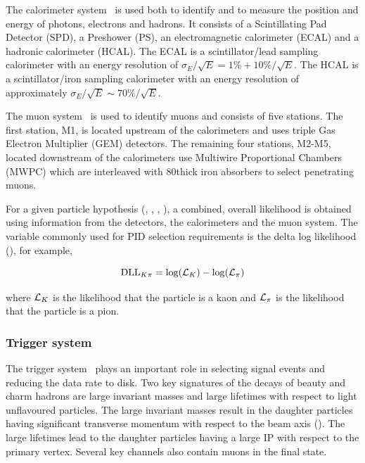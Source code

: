 The calorimeter system~\cite{LHCb-TDR-002} is used both to identify and to measure the position and energy of photons, electrons and hadrons. It consists of a Scintillating Pad Detector (SPD), a Preshower (PS), an electromagnetic calorimeter (ECAL) and a hadronic calorimeter (HCAL). The ECAL is a scintillator/lead sampling calorimeter with an energy resolution of $\sigma_{E}/\sqrt{E} = 1\% + 10\%/\sqrt{E}$. The HCAL is a scintillator/iron sampling calorimeter with an energy resolution of approximately $\sigma_{E}/\sqrt{E} \sim 70\%/\sqrt{E}$. 

The muon system~\cite{LHCb-TDR-004,muon-tdr2,muon-tdr3,LHCb-DP-2012-002} is used to identify muons and consists of five stations. The first station, M1, is located upstream of the calorimeters and uses triple Gas Electron Multiplier (GEM) detectors. The remaining four stations, M2-M5, located downstream of the calorimeters use Multiwire Proportional Chambers (MWPC) which are interleaved with 80\cm thick iron absorbers to select penetrating muons.

For a given particle hypothesis (\kaon, \pion, \muon, \proton), a combined, overall likelihood is obtained using information from the \rich detectors, the calorimeters and the muon system. The variable commonly used for PID selection requirements is the delta log likelihood (\dll), for example,

\begin{equation}
\mathrm{DLL}_{{K}{\pi}} = \log(\mathcal{L}_{{K}}) - \log(\mathcal{L}_{{\pi}})
\end{equation}

\noindent where $\mathcal{L}_{{K}}$ is the likelihood that the particle is a kaon and $\mathcal{L}_{{\pi}}$ is the likelihood that the particle is a pion.
\subsubsection{Trigger system}
\label{detector:trigger}

The \lhcb trigger system~\cite{LHCb-TDR-010,LHCb-DP-2012-004} plays an important role in selecting signal events and reducing the data rate to disk. Two key signatures of the decays of beauty and charm hadrons are large invariant masses and large lifetimes with respect to light unflavoured particles. The large invariant masses result in the daughter particles having significant transverse momentum with respect to the beam axis (\pt). The large lifetimes lead to the daughter particles having a large IP with respect to the primary vertex. Several key channels also contain muons in the final state.


